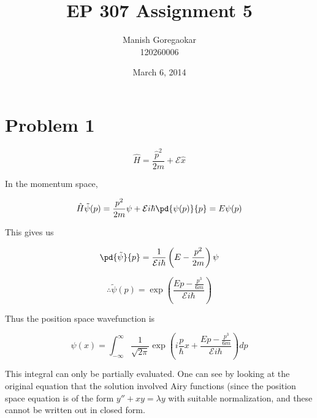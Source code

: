 \documentclass[12pt]{article}
\title{EP 307 Assignment 5}
\author{Manish Goregaokar\\120260006}
\date{March 6, 2014}
\begin{document}
\maketitle

\section*{Problem 1}
$$\hat H = \frac{\hat p^2}{2m} + \mathcal E\hat x$$

In the momentum space,

$$\hat H\tilde\psi(p) = \frac{p^2}{2m}\psi + \mathcal Ei\hbar\pd{\psi(p)}{p}=E\psi(p)$$

This gives us 

$$\pd{\tilde\psi}{p}=\frac{1}{\mathcal E i \hbar}\left(E-\frac{p^2}{2m}\right)\psi$$

$$\boxed{\therefore \tilde\psi(p) = \exp\left(\frac{Ep-\frac{p^3}{6m}}{\mathcal E i \hbar}\right)}$$

Thus the position space wavefunction is

$$\psi(x)=\int_{-\infty}^\infty \frac1{\sqrt{2\pi}}\exp\left(i\frac{p}{\hbar} x+\frac{Ep-\frac{p^3}{6m}}{\mathcal E i \hbar}\right)dp$$

This integral can only be partially evaluated. One can see by looking at the original equation that the solution involved Airy functions (since the position space equation is of the form $y'' +xy=\lambda y$ with suitable normalization, and these cannot be written out in closed form.
\end{document}
